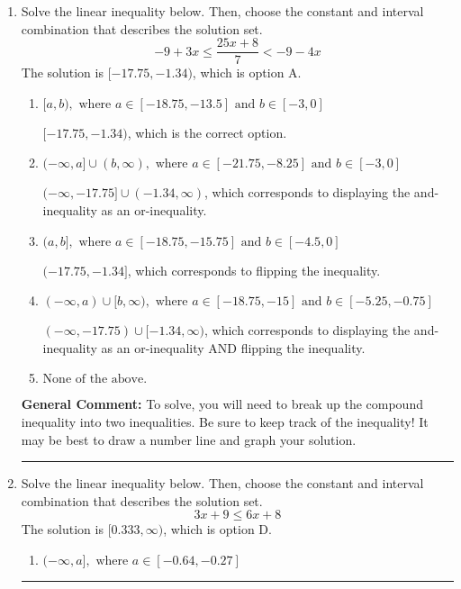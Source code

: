 \documentclass{extbook}[14pt]
\newcommand{\litem}[1]{\item #1

\rule{\textwidth}{0.4pt}}
\begin{document}
\begin{enumerate}
{\begin{enumerate}[label=\Alph*.]
This describes the values less than 6 from 4
\item \( (-\infty, -2) \cup (10, \infty) \)

This describes the values more than 6 from 4
\item \( (-\infty, -2] \cup [10, \infty) \)

This describes the values no less than 6 from 4
\item \( [-2, 10] \)

This describes the values no more than 6 from 4
\item \( \text{None of the above} \)

You likely thought the values in the interval were not correct.
\end{enumerate}

\textbf{General Comment:} When thinking about this language, it helps to draw a number line and try points.
}
\litem{
Solve the linear inequality below. Then, choose the constant and interval combination that describes the solution set.
\[ -9 + 3 x \leq \frac{25 x + 8}{7} < -9 - 4 x \]The solution is \( [-17.75, -1.34) \), which is option A.\begin{enumerate}[label=\Alph*.]
\item \( [a, b), \text{ where } a \in [-18.75, -13.5] \text{ and } b \in [-3, 0] \)

$[-17.75, -1.34)$, which is the correct option.
\item \( (-\infty, a] \cup (b, \infty), \text{ where } a \in [-21.75, -8.25] \text{ and } b \in [-3, 0] \)

$(-\infty, -17.75] \cup (-1.34, \infty)$, which corresponds to displaying the and-inequality as an or-inequality.
\item \( (a, b], \text{ where } a \in [-18.75, -15.75] \text{ and } b \in [-4.5, 0] \)

$(-17.75, -1.34]$, which corresponds to flipping the inequality.
\item \( (-\infty, a) \cup [b, \infty), \text{ where } a \in [-18.75, -15] \text{ and } b \in [-5.25, -0.75] \)

$(-\infty, -17.75) \cup [-1.34, \infty)$, which corresponds to displaying the and-inequality as an or-inequality AND flipping the inequality.
\item \( \text{None of the above.} \)


\end{enumerate}

\textbf{General Comment:} To solve, you will need to break up the compound inequality into two inequalities. Be sure to keep track of the inequality! It may be best to draw a number line and graph your solution.
}
\litem{
Solve the linear inequality below. Then, choose the constant and interval combination that describes the solution set.
\[ 3x + 9 \leq 6x + 8 \]The solution is \( [0.333, \infty) \), which is option D.\begin{enumerate}[label=\Alph*.]
\item \( (-\infty, a], \text{ where } a \in [-0.64, -0.27] \)


\end{enumerate}}
\end{enumerate}
\end{document}
